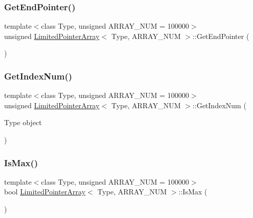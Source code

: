 \subsubsection{\texorpdfstring{Get\+End\+Pointer()}{GetEndPointer()}}
{\footnotesize\ttfamily template$<$class Type, unsigned A\+R\+R\+A\+Y\+\_\+\+N\+UM = 100000$>$ \\
unsigned \mbox{\hyperlink{class_limited_pointer_array}{Limited\+Pointer\+Array}}$<$ Type, A\+R\+R\+A\+Y\+\_\+\+N\+UM $>$\+::Get\+End\+Pointer (\begin{DoxyParamCaption}{ }\end{DoxyParamCaption})\hspace{0.3cm}{\ttfamily [inline]}}

\mbox{\label{class_limited_pointer_array_a2b9d42b57662f29f357b2faf1793aa66}} 
\subsubsection{\texorpdfstring{Get\+Index\+Num()}{GetIndexNum()}}
{\footnotesize\ttfamily template$<$class Type, unsigned A\+R\+R\+A\+Y\+\_\+\+N\+UM = 100000$>$ \\
unsigned \mbox{\hyperlink{class_limited_pointer_array}{Limited\+Pointer\+Array}}$<$ Type, A\+R\+R\+A\+Y\+\_\+\+N\+UM $>$\+::Get\+Index\+Num (\begin{DoxyParamCaption}\item[{Type}]{object }\end{DoxyParamCaption})\hspace{0.3cm}{\ttfamily [inline]}}

\mbox{\label{class_limited_pointer_array_a8bd3a7ea969f307c35934a1bf2803b40}} 
\subsubsection{\texorpdfstring{Is\+Max()}{IsMax()}}
{\footnotesize\ttfamily template$<$class Type, unsigned A\+R\+R\+A\+Y\+\_\+\+N\+UM = 100000$>$ \\
bool \mbox{\hyperlink{class_limited_pointer_array}{Limited\+Pointer\+Array}}$<$ Type, A\+R\+R\+A\+Y\+\_\+\+N\+UM $>$\+::Is\+Max (\begin{DoxyParamCaption}{ }\end{DoxyParamCaption})\hspace{0.3cm}{\ttfamily [inline]}}

